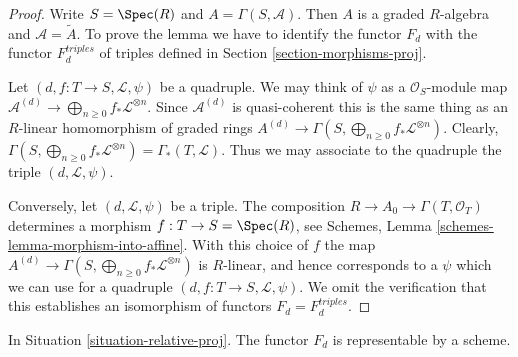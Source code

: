 \begin{proof}
Write $S = \Spec(R)$ and $A = \Gamma(S, \mathcal{A})$.
Then $A$ is a graded $R$-algebra and $\mathcal{A} = \widetilde A$.
To prove the lemma we have to identify the functor $F_d$
with the functor $F_d^{triples}$ of triples defined in Section
\ref{section-morphisms-proj}.

\medskip\noindent
Let $(d, f : T \to S, \mathcal{L}, \psi)$ be a quadruple.
We may think of $\psi$ as a $\mathcal{O}_S$-module map
$\mathcal{A}^{(d)} \to \bigoplus_{n \geq 0} f_*\mathcal{L}^{\otimes n}$.
Since $\mathcal{A}^{(d)}$ is quasi-coherent this is the same
thing as an $R$-linear homomorphism of graded rings
$A^{(d)} \to \Gamma(S, \bigoplus_{n \geq 0} f_*\mathcal{L}^{\otimes n})$.
Clearly, $\Gamma(S, \bigoplus_{n \geq 0} f_*\mathcal{L}^{\otimes n}) =
\Gamma_*(T, \mathcal{L})$. Thus we may associate to
the quadruple the triple $(d, \mathcal{L}, \psi)$.

\medskip\noindent
Conversely, let $(d, \mathcal{L}, \psi)$ be a triple.
The composition $R \to A_0 \to \Gamma(T, \mathcal{O}_T)$
determines a morphism $f : T \to S = \Spec(R)$, see
Schemes, Lemma \ref{schemes-lemma-morphism-into-affine}.
With this choice of $f$ the map
$A^{(d)} \to \Gamma(S, \bigoplus_{n \geq 0} f_*\mathcal{L}^{\otimes n})$
is $R$-linear, and hence corresponds to a $\psi$ which we
can use for a quadruple $(d, f : T \to S, \mathcal{L}, \psi)$.
We omit the verification that this establishes an isomorphism
of functors $F_d = F_d^{triples}$.
\end{proof}

\begin{lemma}
\label{lemma-relative-proj-d}
In Situation \ref{situation-relative-proj}.
The functor $F_d$ is representable by a scheme.
\end{lemma}

